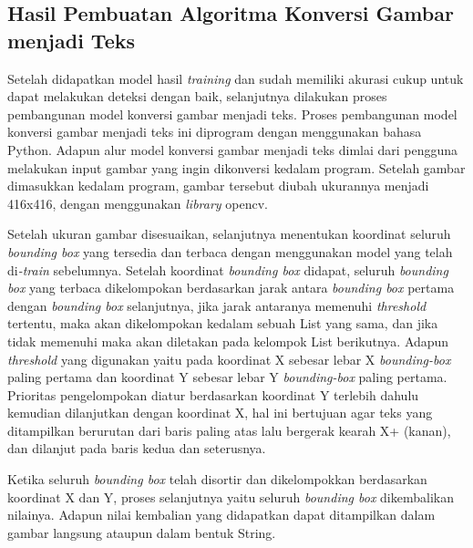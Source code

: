 
\subsection{Hasil Pembuatan Algoritma Konversi Gambar menjadi Teks}
\label{subsec:hasilmembangunmodel}

Setelah didapatkan model hasil \textit{training} dan sudah memiliki akurasi cukup untuk dapat melakukan deteksi dengan baik, selanjutnya dilakukan proses pembangunan model konversi gambar menjadi teks. Proses pembangunan model konversi gambar menjadi teks ini diprogram dengan menggunakan bahasa Python. Adapun alur model konversi gambar menjadi teks dimlai dari pengguna melakukan input gambar yang ingin dikonversi kedalam program. Setelah gambar dimasukkan kedalam program, gambar tersebut diubah ukurannya menjadi 416x416, dengan menggunakan \textit{library} opencv. \par

Setelah ukuran gambar disesuaikan, selanjutnya menentukan koordinat seluruh \textit{bounding box} yang tersedia dan terbaca dengan menggunakan model yang telah di\textit{-train} sebelumnya. Setelah koordinat \textit{bounding box} didapat, seluruh \textit{bounding box} yang terbaca dikelompokan berdasarkan jarak antara \textit{bounding box} pertama dengan \textit{bounding box} selanjutnya, jika jarak antaranya memenuhi \textit{threshold} tertentu, maka akan dikelompokan kedalam sebuah List yang sama, dan jika tidak memenuhi maka akan diletakan pada kelompok List berikutnya. Adapun \textit{threshold} yang digunakan yaitu pada koordinat X sebesar lebar X \textit{bounding-box} paling pertama dan koordinat Y sebesar lebar Y \textit{bounding-box} paling pertama. Prioritas pengelompokan diatur berdasarkan koordinat Y terlebih dahulu kemudian dilanjutkan dengan koordinat X, hal ini bertujuan agar teks yang ditampilkan berurutan dari baris paling atas lalu bergerak kearah X+ (kanan), dan dilanjut pada baris kedua dan seterusnya. \par

Ketika seluruh \textit{bounding box} telah disortir dan dikelompokkan berdasarkan koordinat X dan Y, proses selanjutnya yaitu seluruh \textit{bounding box} dikembalikan nilainya. Adapun nilai kembalian yang didapatkan dapat ditampilkan dalam gambar langsung ataupun dalam bentuk String. 

